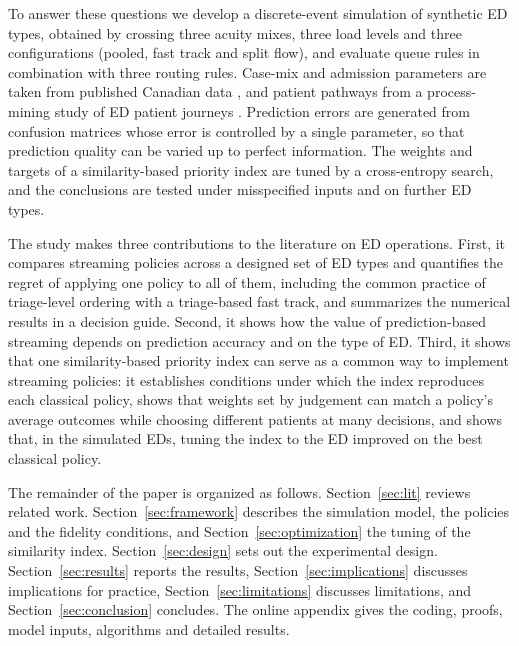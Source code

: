 To answer these questions we develop a discrete-event simulation of \NEdTypes{} synthetic ED types, obtained by crossing three acuity mixes, three load levels and three configurations (pooled, fast track and split flow), and evaluate \NQueueRules{} queue rules in combination with three routing rules. Case-mix and admission parameters are taken from published Canadian data \cite{Holroyd2016_EDCaseMix}, and patient pathways from a process-mining study of ED patient journeys \cite{Rismanchian2023_PatientJourney}. Prediction errors are generated from confusion matrices whose error is controlled by a single parameter, so that prediction quality can be varied up to perfect information. The weights and targets of a similarity-based priority index are tuned by a cross-entropy search, and the conclusions are tested under misspecified inputs and on \NOosTypes{} further ED types.

The study makes three contributions to the literature on ED operations. First, it compares streaming policies across a designed set of ED types and quantifies the regret of applying one policy to all of them, including the common practice of triage-level ordering with a triage-based fast track, and summarizes the numerical results in a decision guide. Second, it shows how the value of prediction-based streaming depends on prediction accuracy and on the type of ED. Third, it shows that one similarity-based priority index can serve as a common way to implement streaming policies: it establishes conditions under which the index reproduces each classical policy, shows that weights set by judgement can match a policy's average outcomes while choosing different patients at many decisions, and shows that, in the simulated EDs, tuning the index to the ED improved on the best classical policy.

The remainder of the paper is organized as follows. Section~\ref{sec:lit} reviews related work. Section~\ref{sec:framework} describes the simulation model, the policies and the fidelity conditions, and Section~\ref{sec:optimization} the tuning of the similarity index. Section~\ref{sec:design} sets out the experimental design. Section~\ref{sec:results} reports the results, Section~\ref{sec:implications} discusses implications for practice, Section~\ref{sec:limitations} discusses limitations, and Section~\ref{sec:conclusion} concludes. The online appendix gives the coding, proofs, model inputs, algorithms and detailed results.
